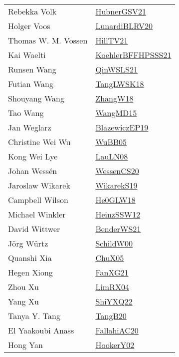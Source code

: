 {\begin{longtable}{p{4cm}p{20cm}}
Rebekka Volk & \href{articles/HubnerGSV21.pdf}{HubnerGSV21}\cite{HubnerGSV21} \\
Holger Voos & \href{articles/LunardiBLRV20.pdf}{LunardiBLRV20}\cite{LunardiBLRV20} \\
Thomas W. M. Vossen & \href{papers/HillTV21.pdf}{HillTV21}\cite{HillTV21} \\
Kai Waelti & \href{articles/KoehlerBFFHPSSS21.pdf}{KoehlerBFFHPSSS21}\cite{KoehlerBFFHPSSS21} \\
Runsen Wang & \href{articles/QinWSLS21.pdf}{QinWSLS21}\cite{QinWSLS21} \\
Futian Wang & \href{}{TangLWSK18}\cite{TangLWSK18} \\
Shouyang Wang & \href{articles/ZhangW18.pdf}{ZhangW18}\cite{ZhangW18} \\
Tao Wang & \href{articles/WangMD15.pdf}{WangMD15}\cite{WangMD15} \\
Jan Weglarz & \href{}{BlazewiczEP19}\cite{BlazewiczEP19} \\
Christine Wei Wu & \href{papers/WuBB05.pdf}{WuBB05}\cite{WuBB05} \\
Kong Wei Lye & \href{papers/LauLN08.pdf}{LauLN08}\cite{LauLN08} \\
Johan Wess{\'{e}}n & \href{papers/WessenCS20.pdf}{WessenCS20}\cite{WessenCS20} \\
Jaroslaw Wikarek & \href{articles/WikarekS19.pdf}{WikarekS19}\cite{WikarekS19} \\
Campbell Wilson & \href{papers/He0GLW18.pdf}{He0GLW18}\cite{He0GLW18} \\
Michael Winkler & \href{articles/HeinzSSW12.pdf}{HeinzSSW12}\cite{HeinzSSW12} \\
David Wittwer & \href{papers/BenderWS21.pdf}{BenderWS21}\cite{BenderWS21} \\
J{\"{o}}rg W{\"{u}}rtz & \href{articles/SchildW00.pdf}{SchildW00}\cite{SchildW00} \\
Quanshi Xia & \href{papers/ChuX05.pdf}{ChuX05}\cite{ChuX05} \\
Hegen Xiong & \href{articles/FanXG21.pdf}{FanXG21}\cite{FanXG21} \\
Zhou Xu & \href{papers/LimRX04.pdf}{LimRX04}\cite{LimRX04} \\
Yang Xu & \href{}{ShiYXQ22}\cite{ShiYXQ22} \\
Tanya Y. Tang & \href{papers/TangB20.pdf}{TangB20}\cite{TangB20} \\
El Yaakoubi Anass & \href{}{FallahiAC20}\cite{FallahiAC20} \\
Hong Yan & \href{papers/HookerY02.pdf}{HookerY02}\cite{HookerY02} \\

\end{longtable}}
